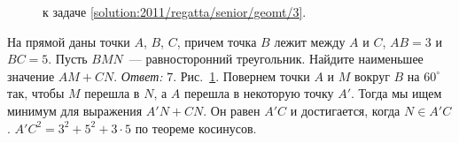 \ifsolution
\begin{figure}\centering
    \caption{к задаче \ref{solution:2011/regatta/senior/geomt/3}.}
    \label{fig:solution:2011/regatta/senior/geomt/3}
\end{figure}
\fi %

\problem
На прямой даны точки $A$, $B$, $C$, причем точка $B$ лежит между $A$ и $C$, $AB = 3$ и $BC = 5$.
Пусть $BMN$~--- равносторонний треугольник.
Найдите наименьшее значение $AM + CN$.
\solution
\label{solution:2011/regatta/senior/geomt/3}%
\emph{Ответ:} $7$.
Рис.~\ref{fig:solution:2011/regatta/senior/geomt/3}.
Повернем точки $A$ и $M$ вокруг $B$ на $60^\circ$ так, чтобы $M$ перешла в $N$,
а $A$ перешла в некоторую точку $A'$.
Тогда мы ищем минимум для выражения $A'N + CN$.
Он равен $A'C$ и достигается, когда $N \in A'C$.
$A'C^2 = 3^2 + 5^2 + 3 \cdot 5$ по теореме косинусов.
\endproblem
